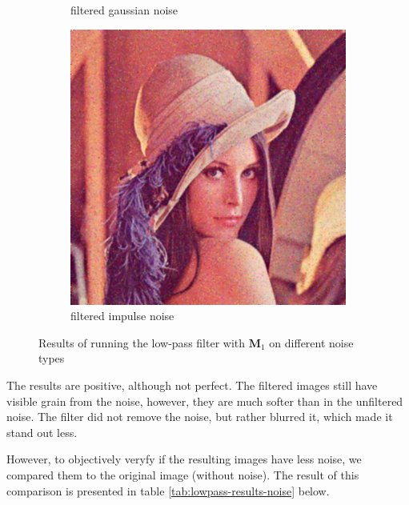 \documentclass[12pt]{article}
\begin{document}
\begin{figure}[ht]
\begin{subfigure}[t]{\subfiguresize}
        \caption{filtered gaussian noise}
    \end{subfigure}
    \begin{subfigure}[t]{\subfiguresize}
        \includegraphics[width=\textwidth]{lenac_lowpass_impulse_1.png}
        \caption{filtered impulse noise}
    \end{subfigure}
    \caption{Results of running the low-pass filter with $\mathbf{M}_1$ on different noise types}
    \label{fig:lowpass-results-noise}
\end{figure}

The results are positive, although not perfect.
The filtered images still have visible grain from the noise, however, they are much softer than in the unfiltered noise.
The filter did not remove the noise, but rather blurred it, which made it stand out less.

However, to objectively veryfy if the resulting images have less noise, we compared them to the original image (without noise).
The result of this comparison is presented in table \ref*{tab:lowpass-results-noise} below.
\end{document}
